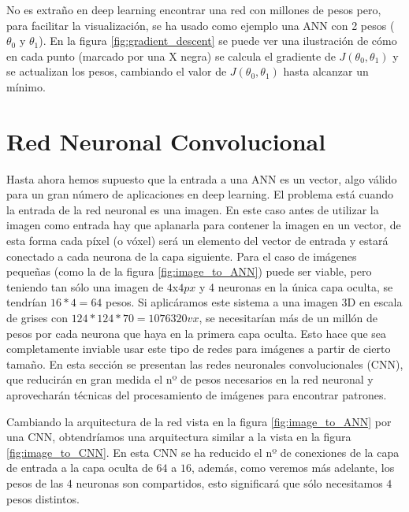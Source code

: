 No es extraño en deep learning encontrar una red con millones de pesos pero, para facilitar la visualización, se ha usado como ejemplo una ANN con 2 pesos ($\theta_0$ y $\theta_1$). En la figura \ref{fig:gradient_descent} se puede ver una ilustración de cómo en cada punto (marcado por una X negra) se calcula el gradiente de $J(\theta_0, \theta_1)$ y se actualizan los pesos, cambiando el valor de $J(\theta_0, \theta_1)$ hasta alcanzar un mínimo.


\section{Red Neuronal Convolucional}\label{sec:cnn}

Hasta ahora hemos supuesto que la entrada a una ANN es un vector, algo válido para un gran número de aplicaciones en deep learning. El problema está cuando la entrada de la red neuronal es una imagen. En este caso antes de utilizar la imagen como entrada hay que aplanarla para contener la imagen en un vector, de esta forma cada píxel (o vóxel) será un elemento del vector de entrada y estará conectado a cada neurona de la capa siguiente. Para el caso de imágenes pequeñas (como la de la figura \ref{fig:image_to_ANN}) puede ser viable, pero teniendo tan sólo una imagen de $4$x$4px$ y 4 neuronas en la única capa oculta, se tendrían $16*4=64$ pesos. Si aplicáramos este sistema a una imagen 3D en escala de grises con $124*124*70=1076320vx$, se necesitarían más de un millón de pesos por cada neurona que haya en la primera capa oculta. Esto hace que sea completamente inviable usar este tipo de redes para imágenes a partir de cierto tamaño. En esta sección se presentan las redes neuronales convolucionales (CNN), que reducirán en gran medida el nº de pesos necesarios en la red neuronal y aprovecharán técnicas del procesamiento de imágenes para encontrar patrones.


Cambiando la arquitectura de la red vista en la figura \ref{fig:image_to_ANN} por una CNN, obtendríamos una arquitectura similar a la vista en la figura \ref{fig:image_to_CNN}. En esta CNN se ha reducido el nº de conexiones de la capa de entrada a la capa oculta de $64$ a $16$, además, como veremos más adelante, los pesos de las 4 neuronas son compartidos, esto significará que sólo necesitamos $4$ pesos distintos.

